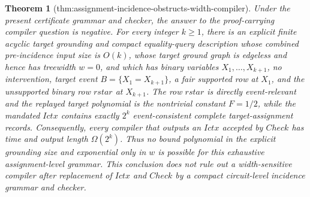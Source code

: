 \documentclass{article}
\newtheorem{theorem}{Theorem}
\begin{document}
\begin{theorem}[thm:assignment-incidence-obstructs-width-compiler]\label{thm:assignment-incidence-obstructs-width-compiler}
Under the present certificate grammar and checker, the answer to the proof-carrying compiler question is negative.  For every integer \(k\geq 1\), there is an explicit finite acyclic target grounding and compact equality-query description whose combined pre-incidence input size is \(O(k)\), whose target ground graph is edgeless and hence has treewidth \(w=0\), and which has binary variables \(X_1,\ldots,X_{k+1}\), no intervention, target event \(B=\{X_1=X_{k+1}\}\), a fair supported row at \(X_1\), and the unsupported binary row \(rstar\) at \(X_{k+1}\).  The row \(rstar\) is directly event-relevant and the replayed target polynomial is the nontrivial constant \(F=1/2\), while the mandated \(Ictx\) contains exactly \(2^k\) event-consistent complete target-assignment records.  Consequently, every compiler that outputs an \(Ictx\) accepted by \(Check\) has time and output length \(\Omega(2^k)\).  Thus no bound polynomial in the explicit grounding size and exponential only in \(w\) is possible for this exhaustive assignment-level grammar.  This conclusion does not rule out a width-sensitive compiler after replacement of \(Ictx\) and \(Check\) by a compact circuit-level incidence grammar and checker.
\end{theorem}
\end{document}
